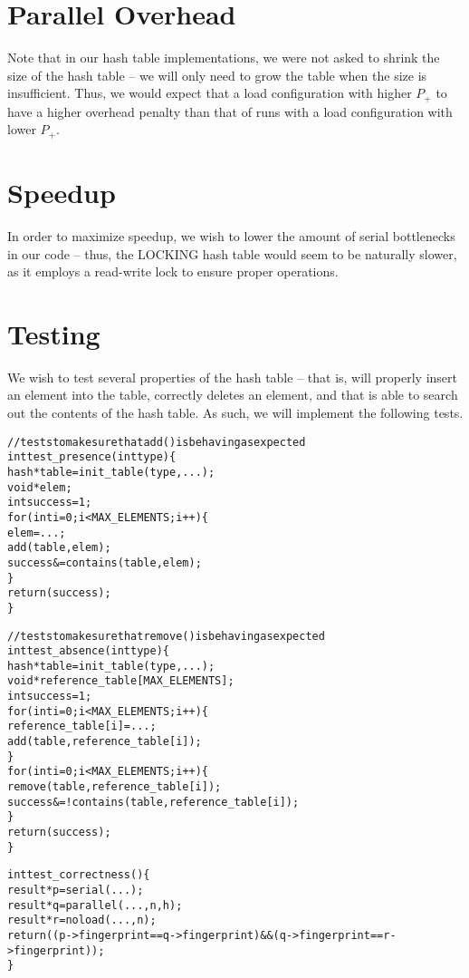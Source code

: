 \documentclass{article}
\newcommand{\code}[1]{\texttt{$\text{#1}$}}
\begin{document}
\section{Parallel Overhead}

Note that in our hash table implementations, we were not asked to shrink the size of the hash table -- we will only need to grow the table when the size is 
insufficient. Thus, we would expect that a load configuration with higher $P_\text{+}$ to have a higher overhead penalty than that of runs with a load configuration 
with lower $P_\text{+}$.

\section{Speedup}

In order to maximize speedup, we wish to lower the amount of serial bottlenecks in our code -- thus, the \code{LOCKING} hash table would seem to be naturally 
slower, as it employs a read-write lock to ensure proper operations.

\section{Testing}

We wish to test several properties of the hash table -- that is,  will properly insert an element into the table,  correctly deletes an 
element, and that  is able to search out the contents of the hash table. As such, we will implement the following tests.

\begin{alltt}

// tests to make sure that add() is behaving as expected
int test_presence(int type) \{
  hash *table = init_table(type, ...);
  void *elem;
  int success = 1;
  for(int i = 0; i < MAX_ELEMENTS; i++) \{
    elem = ...;
    add(table, elem);
    success &= contains(table, elem);
  \}
  return(success);
\}

// tests to make sure that remove() is behaving as expected
int test_absence(int type) \{
  hash *table = init_table(type, ...);
  void *reference_table[MAX_ELEMENTS];
  int success = 1;
  for(int i = 0; i < MAX_ELEMENTS; i++) \{
    reference_table[i] = ...;
    add(table, reference_table[i]);
  \}
  for(int i = 0; i < MAX_ELEMENTS; i++) \{
    remove(table, reference_table[i]);
    success &= !contains(table, reference_table[i]);
  \}
  return(success);
\}

int test_correctness() \{
  result *p = serial(...);
  result *q = parallel(..., n, h);
  result *r = noload(..., n);
  return((p->fingerprint == q->fingerprint) && (q->fingerprint == r->fingerprint));
\}

\end{alltt}
\end{document}
